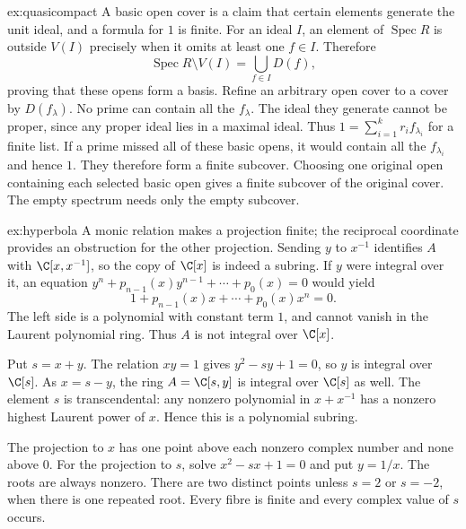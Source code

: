\begin{solution}{ex:quasicompact}
\idea A basic open cover is a claim that certain elements generate the unit ideal, and a formula for $1$ is finite.
\writeup For an ideal $I$, an element of $\operatorname{Spec}R$ is outside $V(I)$ precisely when it omits at least one $f\in I$. Therefore
\[
 \operatorname{Spec}R\setminus V(I)=\bigcup_{f\in I}D(f),
\]
proving that these opens form a basis. Refine an arbitrary open cover to a cover by $D(f_\lambda)$. No prime can contain all the $f_\lambda$. The ideal they generate cannot be proper, since any proper ideal lies in a maximal ideal. Thus $1=\sum_{i=1}^kr_if_{\lambda_i}$ for a finite list. If a prime missed all of these basic opens, it would contain all the $f_{\lambda_i}$ and hence $1$. They therefore form a finite subcover. Choosing one original open containing each selected basic open gives a finite subcover of the original cover. The empty spectrum needs only the empty subcover.
\end{solution}

\begin{solution}{ex:hyperbola}
\idea A monic relation makes a projection finite; the reciprocal coordinate provides an obstruction for the other projection.
\writeup Sending $y$ to $x^{-1}$ identifies $A$ with $\C[x,x^{-1}]$, so the copy of $\C[x]$ is indeed a subring. If $y$ were integral over it, an equation
$y^n+p_{n-1}(x)y^{n-1}+\cdots+p_0(x)=0$ would yield
\[
1+p_{n-1}(x)x+\cdots+p_0(x)x^n=0.
\]
The left side is a polynomial with constant term $1$, and cannot vanish in the Laurent polynomial ring. Thus $A$ is not integral over $\C[x]$.

Put $s=x+y$. The relation $xy=1$ gives $y^2-sy+1=0$, so $y$ is integral over $\C[s]$. As $x=s-y$, the ring $A=\C[s,y]$ is integral over $\C[s]$ as well. The element $s$ is transcendental: any nonzero polynomial in $x+x^{-1}$ has a nonzero highest Laurent power of $x$. Hence this is a polynomial subring.

The projection to $x$ has one point above each nonzero complex number and none above $0$. For the projection to $s$, solve $x^2-sx+1=0$ and put $y=1/x$. The roots are always nonzero. There are two distinct points unless $s=2$ or $s=-2$, when there is one repeated root. Every fibre is finite and every complex value of $s$ occurs.
\end{solution}

